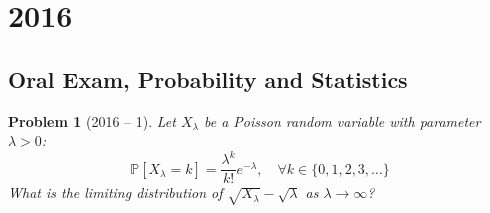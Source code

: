 \documentclass[12pt]{amsart}
\newtheorem{problem}{Problem}
\begin{document}
\section*{2016}
\subsection*{Oral Exam, Probability and Statistics}

\begin{problem}[2016 -- 1]
Let $X_\lambda$ be a Poisson random variable with parameter $\lambda>0$:
$$
\mathbb{P}[X_\lambda=k]=\frac{\lambda^k}{k !} e^{-\lambda}, \quad \forall k \in\{0,1,2,3, \ldots\}
$$
What is the limiting distribution of $\sqrt{X_\lambda}-\sqrt{\lambda}$ as $\lambda \rightarrow \infty$?
\end{problem}
\end{document}
